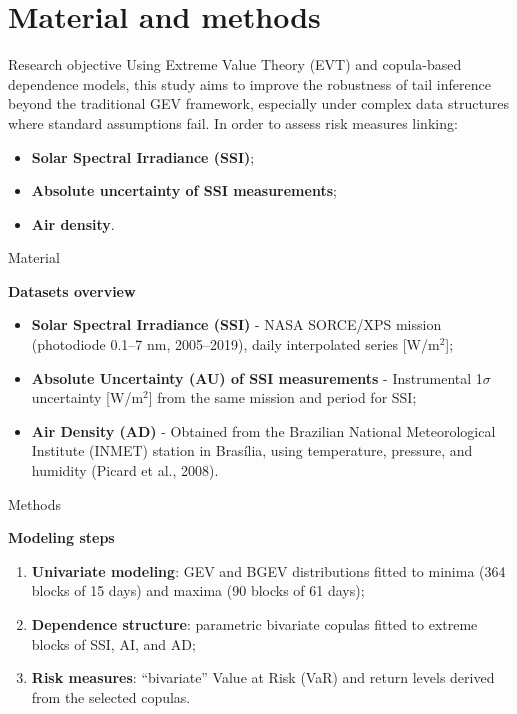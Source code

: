 \section{Material and methods}

\begin{frame}{Research objective}
Using Extreme Value Theory (EVT) and copula-based dependence models, this study aims to improve the robustness of tail inference beyond the traditional GEV framework, especially under complex data structures where standard assumptions fail. 
\vspace*{0.3cm}
In order to assess risk measures linking:
\begin{itemize}
\item[-] \textbf{Solar Spectral Irradiance (SSI)};
\item[-] \textbf{Absolute uncertainty of SSI measurements};
\item[-] \textbf{Air density}.
\end{itemize}
\end{frame}


\begin{frame}{Material}

\textbf{Datasets overview}
\vspace*{0.5cm}
\begin{itemize}
  \item \textbf{Solar Spectral Irradiance (SSI)} - NASA SORCE/XPS mission (photodiode 0.1–7 nm, 2005–2019), daily interpolated series [W/m$^2$];
    \vspace*{0.15cm}
  \item \textbf{Absolute Uncertainty (AU) of SSI measurements} - Instrumental 1$\sigma$ uncertainty [W/m$^2$] from the same mission and period for SSI;
    \vspace*{0.15cm}
  \item \textbf{Air Density (AD)} - Obtained from the Brazilian National Meteorological Institute (INMET) station in Brasília, using temperature, pressure, and humidity (Picard et al., 2008).
\end{itemize}
\end{frame}

\begin{frame}{Methods}

\textbf{Modeling steps}
\vspace*{0.5cm}
\begin{enumerate}
  \item \textbf{Univariate modeling}: GEV and BGEV distributions fitted to minima (364 blocks of 15 days) and maxima (90 blocks of 61 days);
  \vspace*{0.15cm}
  \item \textbf{Dependence structure}: parametric bivariate copulas fitted to extreme blocks of SSI, AI, and AD;
  \vspace*{0.15cm}
  \item \textbf{Risk measures}: ``bivariate'' Value at Risk (VaR) and return levels derived from the selected copulas.
\end{enumerate}


\end{frame}